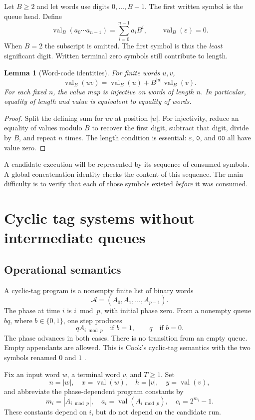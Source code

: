 \documentclass[11pt,a4paper]{article}
\newtheorem{lemma}[lemma]{Lemma}
\theoremstyle{definition}
\theoremstyle{remark}
\newcommand{\eps}{\varepsilon}
\newcommand{\val}{\operatorname{val}}
\newcommand{\CT}{\mathcal A}
\newcommand{\word}[1]{\mathtt{#1}}
\newcommand{\srctag}[1]{\texorpdfstring{\hspace{0.5em}{\normalfont\small\color{accent}[#1]}}{ [#1]}}
\begin{document}
Let $B\geq2$ and let words use digits $0,\ldots,B-1$. The first written symbol is the queue head. Define
\[
 \val_B(a_0\cdots a_{n-1})=\sum_{i=0}^{n-1}a_iB^i,
 \qquad \val_B(\eps)=0.
\]
When $B=2$ the subscript is omitted. The first symbol is thus the \emph{least} significant digit. Written terminal zero symbols still contribute to length.

\begin{lemma}[Word-code identities]\label{cdc:qc:lem:word-code}
For finite words $u,v$,
\[
 \val_B(uv)=\val_B(u)+B^{|u|}\val_B(v).
\]
For each fixed $n$, the value map is injective on words of length $n$. In particular, equality of length and value is equivalent to equality of words.
\end{lemma}
\begin{proof}
Split the defining sum for $uv$ at position $|u|$. For injectivity, reduce an equality of values modulo $B$ to recover the first digit, subtract that digit, divide by $B$, and repeat $n$ times. The length condition is essential: $\eps$, $\word{0}$, and $\word{00}$ all have value zero.
\end{proof}

A candidate execution will be represented by its sequence of consumed symbols. A global concatenation identity checks the content of this sequence. The main difficulty is to verify that each of those symbols existed \emph{before} it was consumed.


\section{Cyclic tag systems without intermediate queues\srctag{07}}\label{cdc:qc:sec:stream}
\subsection{Operational semantics}
A cyclic-tag program is a nonempty finite list of binary words
\[
 \CT=(A_0,A_1,\ldots,A_{p-1}).
\]
The phase at time $i$ is $i\bmod p$, with initial phase zero. From a nonempty queue $bq$, where $b\in\{0,1\}$, one step produces
\[
 qA_{i\bmod p}\quad\text{if }b=1,\qquad q\quad\text{if }b=0.
\]
The phase advances in both cases. There is no transition from an empty queue. Empty appendants are allowed. This is Cook's cyclic-tag semantics with the two symbols renamed $0$ and $1$ \cite{cook}.

Fix an input word $w$, a terminal word $v$, and $T\geq1$. Set
\[
 n=|w|,\quad x=\val(w),\quad h=|v|,\quad y=\val(v),
\]
and abbreviate the phase-dependent program constants by
\[
 m_i=|A_{i\bmod p}|,\quad a_i=\val(A_{i\bmod p}),\quad c_i=2^{m_i}-1.
\]
These constants depend on $i$, but do not depend on the candidate run.
\end{document}
